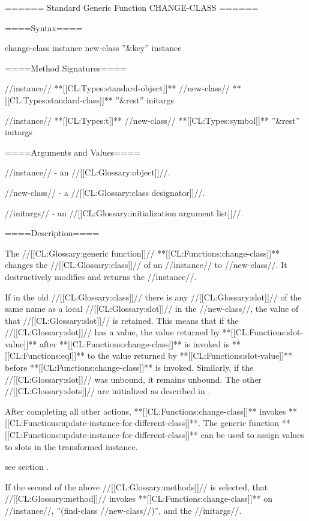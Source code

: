 ====== Standard Generic Function CHANGE-CLASS ======

====Syntax====


\DefgenWithValues change-class {instance new-class ''&key'' {\allowotherkeys}} {instance}

====Method Signatures====


 {//instance// **[[CL:Types:standard-object]]** //new-class// **[[CL:Types:standard-class]]** ''&rest'' initargs}

 {//instance// **[[CL:Types:t]]** //new-class// **[[CL:Types:symbol]]** ''&rest'' initargs}

====Arguments and Values====

//instance// - an //[[CL:Glossary:object]]//.

//new-class// - a //[[CL:Glossary:class designator]]//.


//initargs// - an //[[CL:Glossary:initialization argument list]]//.

====Description====

The //[[CL:Glossary:generic function]]// **[[CL:Functions:change-class]]** changes the //[[CL:Glossary:class]]// of an //instance// to //new-class//. It destructively modifies and returns the //instance//.

If in the old //[[CL:Glossary:class]]// there is any //[[CL:Glossary:slot]]// of the same name as a local //[[CL:Glossary:slot]]// in the //new-class//, the value of that //[[CL:Glossary:slot]]// is retained. This means that if the //[[CL:Glossary:slot]]// has a value, the value returned by **[[CL:Functions:slot-value]]** after **[[CL:Functions:change-class]]** is invoked is **[[CL:Functions:eql]]** to the value returned by **[[CL:Functions:slot-value]]** before **[[CL:Functions:change-class]]** is invoked. Similarly, if the //[[CL:Glossary:slot]]// was unbound, it remains unbound. The other //[[CL:Glossary:slots]]// are initialized as described in \secref\ChangingInstanceClass.

After completing all other actions, **[[CL:Functions:change-class]]** invokes **[[CL:Functions:update-instance-for-different-class]]**. The generic function **[[CL:Functions:update-instance-for-different-class]]** can be used to assign values to slots in the transformed instance.

see section {\secref\InitNewLocalSlots}.



If the second of the above //[[CL:Glossary:methods]]// is selected, that //[[CL:Glossary:method]]// invokes **[[CL:Functions:change-class]]** on //instance//, ''(find-class //new-class//)'', and the //initargs//.


